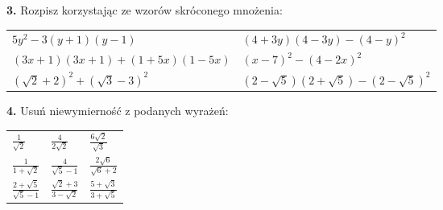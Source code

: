 \documentclass[12pt,a4paper]{article}
\theoremstyle{break}
\begin{document}
\begin{mdframed}[style=zad]
	\vspace{0.2cm}
	\textbf{3.} Rozpisz korzystając ze wzorów skróconego mnożenia:
\end{mdframed}

	\begin{enumerate}[a)] \begin{tabular}{p{8cm} p{8cm}} 
		\item $5y^2-3(y+1)(y-1)$ & \vspace{0.25cm}\item$(4+3y)(4-3y)-(4-y)^2$ \\
		\item $(3x+1)(3x+1)+(1+5x)(1-5x)$ & \item $(x-7)^2-(4-2x)^2$ \\
		\item $(\sqrt{2}+2)^2+(\sqrt{3}-3)^2$ & \item $(2-\sqrt{5})(2+\sqrt{5})-(2-\sqrt{5})^2$ \\
	\end{tabular} \end{enumerate}
	\newpage
\begin{mdframed}[style=zad]
		\vspace{0.2cm}
		\textbf{4.} Usuń niewymierność z podanych wyrażeń:
	\end{mdframed}
	
	\begin{enumerate}[a)] \begin{tabular}{p{5cm} p{5cm} p{5cm}} 
			\item \Large$\frac{1}{\sqrt{2}}$ & \vspace{0.25cm}\item\Large$\frac{4}{2\sqrt{2}}$ &\vspace{0.25cm}\item \Large$\frac{6\sqrt{2}}{\sqrt{3}}$\\
			\item \Large$\frac{1}{1+\sqrt{2}}$ & \item \Large$\frac{4}{\sqrt{5}-1}$ &\item \Large$\frac{2\sqrt{6}}{\sqrt{6}+2}$\\
			\item \Large$\frac{2+\sqrt{5}}{\sqrt{5}-1}$ & \item \Large$\frac{\sqrt{2}+3}{3-\sqrt{2}}$ &\item \Large$\frac{5+\sqrt{3}}{3+\sqrt{5}}$\\
	\end{tabular} \end{enumerate}
	
\end{document}
